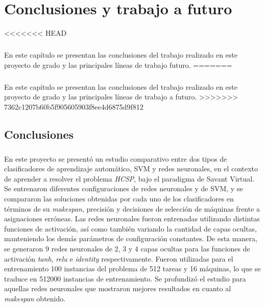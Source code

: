 \chapter{Conclusiones y trabajo a futuro} \label{section-conclusiones}

<<<<<<< HEAD
\paragraph{}En este capítulo se presentan las conclusiones del trabajo realizado en este proyecto de grado y las principales líneas de trabajo futuro.
=======
\paragraph{}En este capítulo se presentan las conclusiones del trabajo realizado en este proyecto de grado y las principales líneas de trabajo a futuro.
>>>>>>> 7362c1207b60b5f905605903f8ee4d6875d9f812

\section{Conclusiones}

\paragraph{}En este proyecto se presentó un estudio comparativo entre dos tipos de clasificadores de aprendizaje automático, SVM y redes neuronales, en el contexto de aprender a resolver el problema \textit{HCSP}, bajo el paradigma de Savant Virtual.
Se entrenaron diferentes configuraciones de redes neuronales y de SVM, y se compararon las soluciones obtenidas por cada uno de los clasificadores en términos de su \textit{makespan}, precisión y decisiones de selección de máquinas frente a asignaciones erróneas.
Las redes neuronales fueron entrenadas utilizando distintas funciones de activación, así como también variando la cantidad de capas ocultas, manteniendo los demás parámetros de configuración constantes.
De esta manera, se generaron 9 redes neuronales de 2, 3 y 4 capas ocultas para las funciones de activación \textit{tanh}, \textit{relu} e \textit{identity} respectivamente.
Fueron utilizadas para el entrenamiento 100 instancias del problema de 512 tareas y 16 máquinas, lo que se traduce en 512000 instancias de entrenamiento.
Se profundizó el estudio para aquellas redes neuronales que mostraron mejores resultados en cuanto al \textit{makespan} obtenido.

